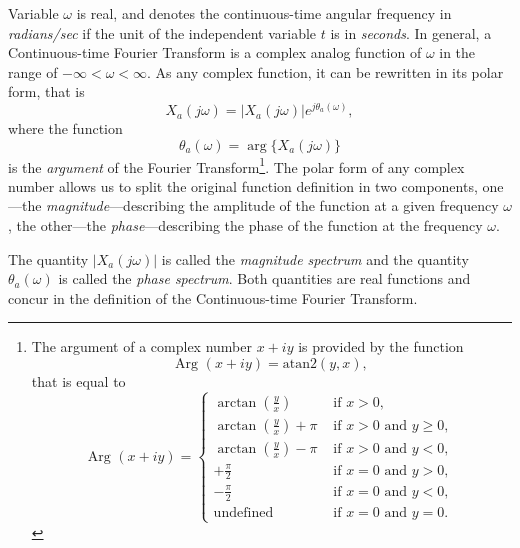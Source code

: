 \documentclass[\documentfontsize, twocolumn]{\classname}
\begin{document}
Variable $\omega$ is real, and denotes the continuous-time angular frequency in
\emph{radians/sec} if the unit of the independent variable $t$ is in
\emph{seconds}. In general, a Continuous-time Fourier Transform is a complex
analog function of $\omega$ in the range of $-\infty < \omega < \infty$. As any
complex function, it can be rewritten in its polar form, that is
\begin{equation}\label{eqn:continuousTimeFourierTransformPolar}
    X_a(j\omega) = \left|X_a(j\omega)\right|e^{j\theta_a(\omega)},
\end{equation}
where the function
\begin{equation}\label{eqn:continuousTimeFourierTransformPolarTheta}
    \theta_a(\omega)=\arg\{X_a(j\omega)\}
\end{equation}
is the \emph{argument} of the Fourier Transform\footnote{
    The argument of a complex number $x+iy$ is provided by the function \[\mbox{Arg }(x+iy) = \mbox{atan2} (y, x),\] that is equal to
    \[
        \mbox{Arg }(x+iy) = \left\{\begin{array}{ll}
                \arctan{(\frac y x)} & \mbox { if } x>0,\\
                \arctan{(\frac y x)} + \pi & \mbox { if } x>0 \mbox { and } y \geq 0,\\
                \arctan{(\frac y x)} - \pi & \mbox { if } x>0 \mbox { and } y < 0,\\
                +\frac \pi 2  & \mbox { if } x=0 \mbox { and } y>0,\\
                -\frac \pi 2  & \mbox { if } x=0 \mbox { and } y<0,\\
                \mathrm{ undefined } & \mbox{ if } x=0 \mbox { and } y = 0.
            \end{array}\right.
    \]
}.
The polar form of any complex number allows us to split the original function
definition in two components, one---the \emph{magnitude}---describing the
amplitude of the function at a given frequency $\omega$, the other---the
\emph{phase}---describing the phase of the function at the frequency $\omega$.

The quantity $|X_a(j\omega)|$ is called the \emph{magnitude spectrum} and the quantity $\theta_a(\omega)$ is called the \emph{phase spectrum}. Both quantities are real functions and concur in the definition of the Continuous-time Fourier Transform.
\end{document}
